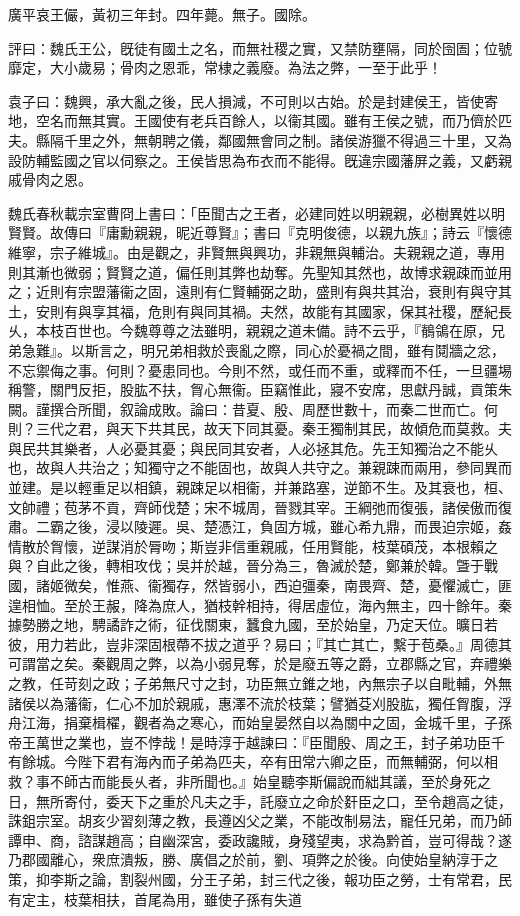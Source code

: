 
\begin{pinyinscope}
廣平哀王儼，黃初三年封。四年薨。無子。國除。

評曰：魏氏王公，旣徒有國土之名，而無社稷之實，又禁防壅隔，同於囹圄；位號靡定，大小歲易；骨肉之恩乖，常棣之義廢。為法之弊，一至于此乎！

袁子曰：魏興，承大亂之後，民人損減，不可則以古始。於是封建侯王，皆使寄地，空名而無其實。王國使有老兵百餘人，以衞其國。雖有王侯之號，而乃儕於匹夫。縣隔千里之外，無朝聘之儀，鄰國無會同之制。諸侯游獵不得過三十里，又為設防輔監國之官以伺察之。王侯皆思為布衣而不能得。旣違宗國藩屏之義，又虧親戚骨肉之恩。

魏氏春秋載宗室曹冏上書曰：「臣聞古之王者，必建同姓以明親親，必樹異姓以明賢賢。故傳曰『庸勳親親，昵近尊賢』；書曰『克明俊德，以親九族』；詩云『懷德維寧，宗子維城』。由是觀之，非賢無與興功，非親無與輔治。夫親親之道，專用則其漸也微弱；賢賢之道，偏任則其弊也劫奪。先聖知其然也，故博求親疎而並用之；近則有宗盟藩衞之固，遠則有仁賢輔弼之助，盛則有與共其治，衰則有與守其土，安則有與享其福，危則有與同其禍。夫然，故能有其國家，保其社稷，歷紀長乆，本枝百世也。今魏尊尊之法雖明，親親之道未備。詩不云乎，『鶺鴒在原，兄弟急難』。以斯言之，明兄弟相救於喪亂之際，同心於憂禍之間，雖有鬩牆之忿，不忘禦侮之事。何則？憂患同也。今則不然，或任而不重，或釋而不任，一旦疆埸稱警，關門反拒，股肱不扶，胷心無衞。臣竊惟此，寢不安席，思獻丹誠，貢策朱闕。謹撰合所聞，叙論成敗。論曰：昔夏、殷、周歷世數十，而秦二世而亡。何則？三代之君，與天下共其民，故天下同其憂。秦王獨制其民，故傾危而莫救。夫與民共其樂者，人必憂其憂；與民同其安者，人必拯其危。先王知獨治之不能乆也，故與人共治之；知獨守之不能固也，故與人共守之。兼親踈而兩用，參同異而並建。是以輕重足以相鎮，親踈足以相衞，并兼路塞，逆節不生。及其衰也，桓、文帥禮；苞茅不貢，齊師伐楚；宋不城周，晉戮其宰。王綱弛而復張，諸侯傲而復肅。二霸之後，浸以陵遲。吳、楚憑江，負固方城，雖心希九鼎，而畏迫宗姬，姦情散於胷懷，逆謀消於脣吻；斯豈非信重親戚，任用賢能，枝葉碩茂，本根賴之與？自此之後，轉相攻伐；吳并於越，晉分為三，魯滅於楚，鄭兼於韓。曁于戰國，諸姬微矣，惟燕、衞獨存，然皆弱小，西迫彊秦，南畏齊、楚，憂懼滅亡，匪遑相恤。至於王赧，降為庶人，猶枝幹相持，得居虛位，海內無主，四十餘年。秦據勢勝之地，騁譎詐之術，征伐關東，蠶食九國，至於始皇，乃定天位。曠日若彼，用力若此，豈非深固根蔕不拔之道乎？易曰；『其亡其亡，繫于苞桑。』周德其可謂當之矣。秦觀周之弊，以為小弱見奪，於是廢五等之爵，立郡縣之官，弃禮樂之教，任苛刻之政；子弟無尺寸之封，功臣無立錐之地，內無宗子以自毗輔，外無諸侯以為藩衞，仁心不加於親戚，惠澤不流於枝葉；譬猶芟刈股肱，獨任胷腹，浮舟江海，捐棄楫櫂，觀者為之寒心，而始皇晏然自以為關中之固，金城千里，子孫帝王萬世之業也，豈不悖哉！是時淳于越諫曰：『臣聞殷、周之王，封子弟功臣千有餘城。今陛下君有海內而子弟為匹夫，卒有田常六卿之臣，而無輔弼，何以相救？事不師古而能長乆者，非所聞也。』始皇聽李斯偏說而絀其議，至於身死之日，無所寄付，委天下之重於凡夫之手，託廢立之命於姧臣之口，至令趙高之徒，誅鉏宗室。胡亥少習刻薄之教，長遵凶父之業，不能改制易法，寵任兄弟，而乃師譚申、商，諮謀趙高；自幽深宮，委政讒賊，身殘望夷，求為黔首，豈可得哉？遂乃郡國離心，衆庶潰叛，勝、廣倡之於前，劉、項弊之於後。向使始皇納淳于之策，抑李斯之論，割裂州國，分王子弟，封三代之後，報功臣之勞，士有常君，民有定主，枝葉相扶，首尾為用，雖使子孫有失道
\end{pinyinscope}
